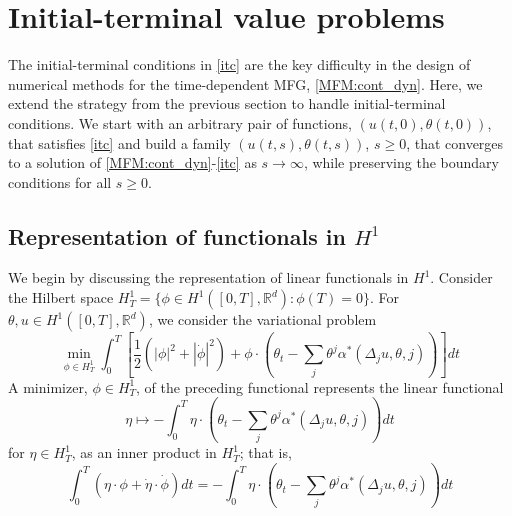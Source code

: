 \documentclass[12pt]{amsart}
\newcommand{\Rr}{{\mathbb{R}}}
\newcommand{\1}{{\chi}}
\newcommand{\lb}{\left(}
\newcommand{\rb}{\right)}
\theoremstyle{definition}
\begin{document}
                
\section{Initial-terminal value problems} 
\label{sec:mean_field_solution}
        The initial-terminal conditions in \eqref{itc} are 
         the key difficulty in the design of numerical methods for the time-dependent MFG, \eqref{MFM:cont_dyn}. 
        Here, we extend the strategy from the previous section to handle initial-terminal conditions. 
        We start with an arbitrary pair of functions, $(u(t,0),\theta(t,0))$, that satisfies \eqref{itc} and build a family 
        $(u(t,s),\theta(t,s))$, $s\geq 0$, that converges to a solution of \eqref{MFM:cont_dyn}-\eqref{itc} as $s\to \infty$,
        while preserving the boundary conditions for all $s\geq 0$.  
        \subsection{Representation of functionals in $H^1$} 
        \label{sub:representation_of_functionals_in_h_1}
                We begin by discussing the representation of linear functionals in $H^1$.
                Consider the Hilbert space $H^1_T=\{\phi \in H^1([0,T], \Rr^d): \phi(T)=0\}$.
                For $\theta, u\in H^1([0,T], \Rr^d)$, we consider the variational problem
                \begin{equation}
                \label{vp1}
                                \min_{\phi\in H^1_T} \int_0^T
                                \left[
                                \frac{1}{2}(|\phi|^2 + |\dot\phi|^2) + \phi \cdot \lb \theta_t - \sum_j \theta^j \alpha^*(\Delta_j u, \theta,j) \rb \right] dt
                 \end{equation}
                A minimizer, $\phi\in H^1_T$, of the preceding functional represents the linear functional
                \begin{equation*}
                        \eta\mapsto -\int_0^T\eta \cdot\lb \theta_t - \sum_j \theta^j \alpha^*(\Delta_j u, \theta,j) \rb dt
                \end{equation*}
                for $\eta\in H^1_T$,
                as an inner product in $H^1_T$; that is,
                                \begin{equation*}
                                        \int_0^T \lb \eta \cdot\phi + \dot \eta \cdot\dot \phi \rb dt = - \int_0^T \eta \cdot \lb \theta_t - \sum_j \theta^j \alpha^*(\Delta_j u, \theta,j) \rb dt
                                \end{equation*}
\end{document}
